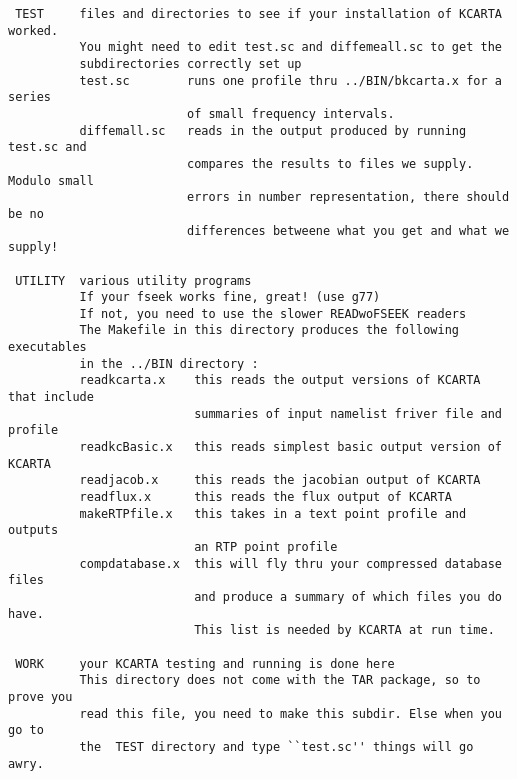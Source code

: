 \documentclass[11pt]{article}
\begin{document}
\begin{verbatim}
 TEST     files and directories to see if your installation of KCARTA worked.
          You might need to edit test.sc and diffemeall.sc to get the 
          subdirectories correctly set up
          test.sc        runs one profile thru ../BIN/bkcarta.x for a series 
                         of small frequency intervals.
          diffemall.sc   reads in the output produced by running test.sc and
                         compares the results to files we supply. Modulo small
                         errors in number representation, there should be no
                         differences betweene what you get and what we supply!

 UTILITY  various utility programs 
          If your fseek works fine, great! (use g77)
          If not, you need to use the slower READwoFSEEK readers
          The Makefile in this directory produces the following executables
          in the ../BIN directory : 
          readkcarta.x    this reads the output versions of KCARTA that include
                          summaries of input namelist friver file and profile
          readkcBasic.x   this reads simplest basic output version of KCARTA
          readjacob.x     this reads the jacobian output of KCARTA
          readflux.x      this reads the flux output of KCARTA
          makeRTPfile.x   this takes in a text point profile and outputs
                          an RTP point profile
          compdatabase.x  this will fly thru your compressed database files
                          and produce a summary of which files you do have. 
                          This list is needed by KCARTA at run time.

 WORK     your KCARTA testing and running is done here
          This directory does not come with the TAR package, so to prove you 
          read this file, you need to make this subdir. Else when you go to 
          the  TEST directory and type ``test.sc'' things will go awry.


\end{verbatim}
\end{document}
